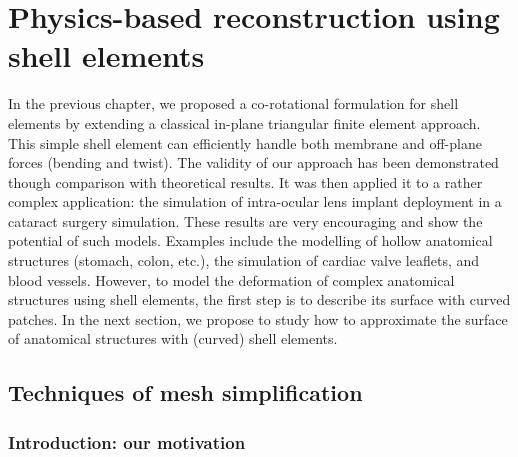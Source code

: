 \chapter{Physics-based reconstruction using shell elements}
\label{chap9}
\begin{shortAbstract}
In the previous chapter, we proposed a co-rotational formulation for shell elements by extending a classical in-plane triangular finite element approach. This simple shell element can efficiently handle both membrane and off-plane forces (bending and twist). The validity of our approach has been demonstrated though comparison with theoretical results. It was then applied it to a rather complex application: the simulation of intra-ocular lens implant deployment in a cataract surgery simulation. These results are very encouraging and show the potential of such models. Examples include the modelling of hollow anatomical structures (stomach, colon, etc.), the simulation of cardiac valve leaflets, and blood vessels. However, to model the deformation of complex anatomical structures using shell elements, the first step is to describe its surface with curved patches. In the next section, we propose to study how to approximate the surface of anatomical structures with (curved) shell elements.
\end{shortAbstract}


\section{Techniques of mesh simplification}

\subsection{Introduction: our motivation}

